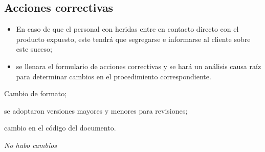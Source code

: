 \subsection{Acciones correctivas}
\begin{itemize}
	\item En caso de que el personal con heridas entre en contacto directo con el producto expuesto, este tendrá que segregarse e informarse al cliente sobre este suceso;
	\item se llenara el formulario de acciones correctivas y se hará un análisis causa raíz para determinar cambios en el procedimiento correspondiente.
\end{itemize}

\begin{changelog}[simple, sectioncmd=\subsection*,label=changelog-1.8]
	\begin{version}[v=2.1, date=2023--01, author=Pablo E. Alanis]
			\item Cambio de formato;
			\item se adoptaron versiones mayores y menores para revisiones;
			\item cambio en el código del documento.
	\end{version}

	\begin{version}[v=1.8, date=2022--05, author=Alonso M.]
		\item \textit{No hubo cambios}
	\end{version}
\end{changelog}
